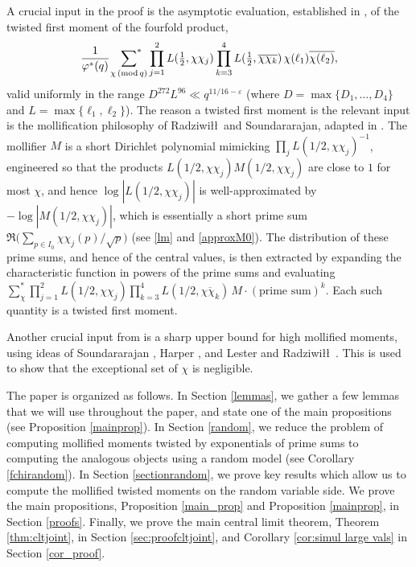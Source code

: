 \documentclass[12pt, reqno]{amsart}
\renewcommand{\pmod}[1]{\,(\mathrm{mod}\,#1)}
\numberwithin{equation}{section}
\numberwithin{theorem}{section}
\numberwithin{equation}{section}
\def\sumstar{\sideset{}{^*}\sum}
\begin{document}
A crucial input in the proof is the asymptotic evaluation, established in \cite{BFM}, of the twisted
first moment of the fourfold product,
\[
\frac{1}{\varphi^*(q)}\ \sumstar_{\chi \pmod q}
\prod_{j=1}^2 L(\tfrac12,\chi\chi_j) \prod_{k=3}^4 L(\tfrac12, \overline{\chi\chi_k})\,\chi(\ell_1)\overline{\chi(\ell_2)},
\]
valid uniformly in the range $D^{272}L^{96}\ll q^{11/16-\varepsilon}$ (where $D= \max\{D_1,\ldots, D_4\}$ and $L= \max\{\ell_1,\ell_2\}$). The reason a twisted first moment is the relevant input is the mollification
philosophy of Radziwi\l\l\ and Soundararajan, adapted in \cite{BELP}. The mollifier $M$ is a short
Dirichlet polynomial mimicking $\prod_j L(1/2,\chi\chi_j)^{-1}$, engineered so that
the products $L(1/2,\chi\chi_j)M(1/2,\chi\chi_j)$ are close to $1$ for most
$\chi$, and hence $\log|L(1/2,\chi\chi_j)|$ is well-approximated by $-\log|M(1/2,\chi\chi_j)|$, which is essentially a short prime sum
$\Re\big(\sum_{p\in I_0}\chi\chi_j(p)/\sqrt p\big)$ (see \eqref{lm} and \eqref{approxM0}). The distribution of these prime sums, and
hence of the central values, is then extracted by expanding the characteristic
function in powers of the prime sums and evaluating
$\sum_\chi^*\prod_{j=1}^2 L(1/2,\chi\chi_j) \prod_{k=3}^4 L(1/2, \overline{\chi\chi_k})\,M\cdot(\text{prime
sum})^k$. Each such
quantity is a twisted first moment.

Another crucial input from \cite{BFM} is a sharp upper bound 
for high mollified moments, using ideas of Soundararajan \cite{S}, Harper \cite{H}, and Lester and Radziwi\l\l\ \cite{LR}. This is used to show that the exceptional set of
$\chi$ is negligible. 

The paper is organized as follows. In Section \ref{lemmas}, we gather a few lemmas that we will use throughout the paper, and state one of the main propositions (see Proposition \ref{mainprop}). In Section \ref{random}, we reduce the problem of computing mollified moments twisted by exponentials of prime sums %
to computing the analogous objects using a random model (see Corollary \ref{fchirandom}). In Section \ref{sectionrandom}, we prove key results which allow us to compute the mollified twisted moments on the random variable side. We prove the main propositions, Proposition \ref{main_prop} and Proposition \ref{mainprop}, in Section \ref{proofs}. Finally, we prove the main central limit theorem, Theorem \ref{thm:cltjoint}, in Section \ref{sec:proofcltjoint}, and Corollary \ref{cor:simul large vals} in Section \ref{cor_proof}.
\newline
\end{document}
